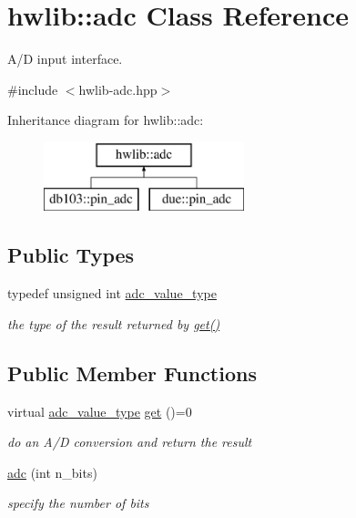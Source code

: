 \hypertarget{classhwlib_1_1adc}{}\section{hwlib\+:\+:adc Class Reference}
\label{classhwlib_1_1adc}


A/D input interface.  




{\ttfamily \#include $<$hwlib-\/adc.\+hpp$>$}

Inheritance diagram for hwlib\+:\+:adc\+:\begin{figure}[H]
\begin{center}
\leavevmode
\includegraphics[height=2.000000cm]{classhwlib_1_1adc}
\end{center}
\end{figure}
\subsection*{Public Types}
\begin{DoxyCompactItemize}
\item 
typedef unsigned int \hyperlink{classhwlib_1_1adc_a7ce65f485597a481a518a4b84073605f}{adc\+\_\+value\+\_\+type}\hypertarget{classhwlib_1_1adc_a7ce65f485597a481a518a4b84073605f}{}\label{classhwlib_1_1adc_a7ce65f485597a481a518a4b84073605f}

\begin{DoxyCompactList}\small\item\em the type of the result returned by \hyperlink{classhwlib_1_1adc_a97c3dee32f72a2e7278e01b1a8e924ec}{get()} \end{DoxyCompactList}\end{DoxyCompactItemize}
\subsection*{Public Member Functions}
\begin{DoxyCompactItemize}
\item 
virtual \hyperlink{classhwlib_1_1adc_a7ce65f485597a481a518a4b84073605f}{adc\+\_\+value\+\_\+type} \hyperlink{classhwlib_1_1adc_a97c3dee32f72a2e7278e01b1a8e924ec}{get} ()=0
\begin{DoxyCompactList}\small\item\em do an A/D conversion and return the result \end{DoxyCompactList}\item 
\hyperlink{classhwlib_1_1adc_a7750dfea666ef62fdfb3024cdb66271d}{adc} (int n\+\_\+bits)\hypertarget{classhwlib_1_1adc_a7750dfea666ef62fdfb3024cdb66271d}{}\label{classhwlib_1_1adc_a7750dfea666ef62fdfb3024cdb66271d}

\begin{DoxyCompactList}\small\item\em specify the number of bits \end{DoxyCompactList}\end{DoxyCompactItemize}
